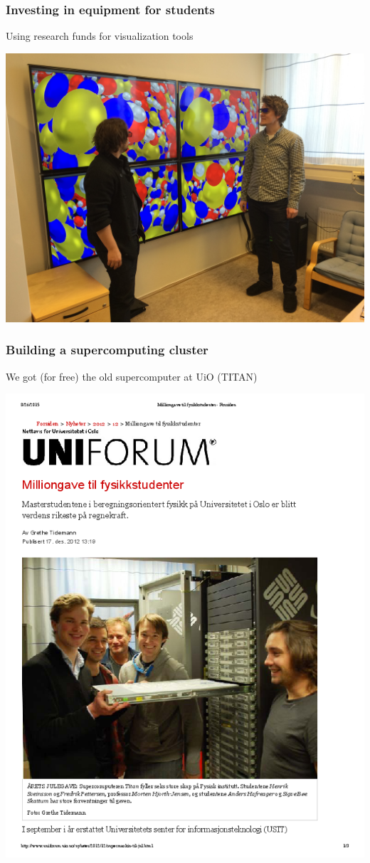 \documentclass{beamer}
\begin{document}
\begin{frame}
\frametitle{Investing in equipment for students}

\begin{block}{Using research funds for visualization tools }


\centerline{\includegraphics[width=0.7\linewidth]{fig-future/visualize.jpg}}



\end{block}
\end{frame}

\begin{frame}
\frametitle{Building a supercomputing cluster}

\begin{block}{We got (for free) the old supercomputer at UiO (TITAN) }


\centerline{\includegraphics[width=0.7\linewidth]{fig-future/uniforum-0.png}}



\end{block}
\end{frame}
\end{document}
